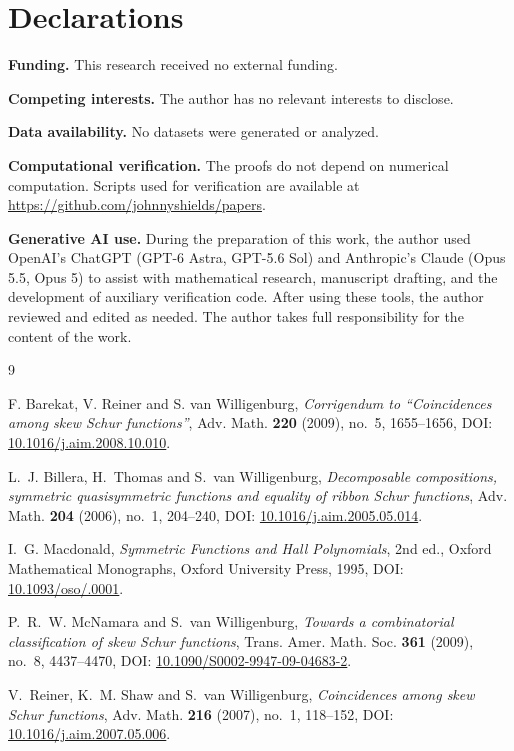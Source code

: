 \documentclass[11pt,a4paper]{amsart}
\numberwithin{equation}{section}
\theoremstyle{plain}
\theoremstyle{definition}
\begin{document}
\section*{Declarations}

{\footnotesize
\noindent\textbf{Funding.} This research received no external funding.

\smallskip
\noindent\textbf{Competing interests.} The author has no relevant interests to disclose.

\smallskip
\noindent\textbf{Data availability.} No datasets were generated or analyzed.

\smallskip
\noindent\textbf{Computational verification.} The proofs do not depend on numerical computation.  Scripts used for verification are available at \url{https://github.com/johnnyshields/papers}.

\smallskip
\noindent\textbf{Generative AI use.} During the preparation of this work, the author used OpenAI's ChatGPT (GPT-6 Astra, GPT-5.6 Sol) and Anthropic's Claude (Opus 5.5, Opus 5) to assist with mathematical research, manuscript drafting, and the development of auxiliary verification code.  After using these tools, the author reviewed and edited as needed.  The author takes full responsibility for the content of the work.
\par}

\begin{thebibliography}{9}

F. Barekat, V. Reiner and S. van Willigenburg,
\emph{Corrigendum to ``Coincidences among skew Schur functions''},
Adv. Math. \textbf{220} (2009), no.~5, 1655--1656,
DOI: \href{https://doi.org/10.1016/j.aim.2008.10.010}{10.1016/\allowbreak j.aim.2008.10.010}.

L.~J. Billera, H.~Thomas and S.~van Willigenburg,
\emph{Decomposable compositions, symmetric quasisymmetric functions and equality of ribbon Schur functions},
Adv. Math. \textbf{204} (2006), no.~1, 204--240,
DOI: \href{https://doi.org/10.1016/j.aim.2005.05.014}{10.1016/\allowbreak j.aim.2005.05.014}.

I.~G. Macdonald,
\emph{Symmetric Functions and Hall Polynomials}, 2nd ed.,
Oxford Mathematical Monographs, Oxford University Press, 1995,
DOI: \href{https://doi.org/10.1093/oso/9780198534891.001.0001}{10.1093/\allowbreak oso/.0001}.

P.~R.~W. McNamara and S.~van Willigenburg,
\emph{Towards a combinatorial classification of skew Schur functions},
Trans. Amer. Math. Soc. \textbf{361} (2009), no.~8, 4437--4470,
DOI: \href{https://doi.org/10.1090/S0002-9947-09-04683-2}{10.1090/\allowbreak S0002-9947-09-04683-2}.

V.~Reiner, K.~M. Shaw and S.~van Willigenburg,
\emph{Coincidences among skew Schur functions},
Adv. Math. \textbf{216} (2007), no.~1, 118--152,
DOI: \href{https://doi.org/10.1016/j.aim.2007.05.006}{10.1016/\allowbreak j.aim.2007.05.006}.

\end{thebibliography}
\end{document}
